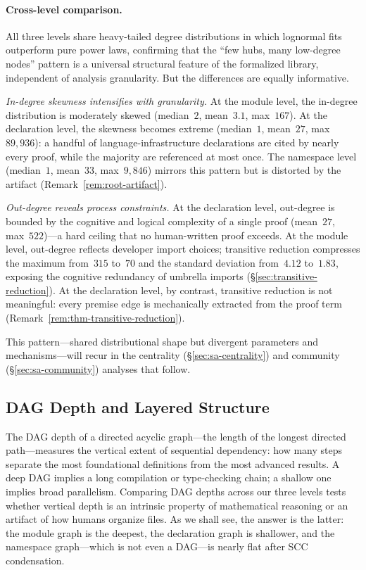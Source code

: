 \paragraph{Cross-level comparison.}
All three levels share heavy-tailed degree distributions in which lognormal fits outperform pure power laws, confirming that the ``few hubs, many low-degree nodes'' pattern is a universal structural feature of the formalized library, independent of analysis granularity. But the differences are equally informative.

\emph{In-degree skewness intensifies with granularity.} At the module level, the in-degree distribution is moderately skewed (median~$2$, mean~$3.1$, max~$167$). At the declaration level, the skewness becomes extreme (median~$1$, mean~$27$, max~$89{,}936$): a handful of language-infrastructure declarations are cited by nearly every proof, while the majority are referenced at most once. The namespace level (median~$1$, mean~$33$, max~$9{,}846$) mirrors this pattern but is distorted by the  artifact (Remark~\ref{rem:root-artifact}).

\emph{Out-degree reveals process constraints.} At the declaration level, out-degree is bounded by the cognitive and logical complexity of a single proof (mean~$27$, max~$522$)---a hard ceiling that no human-written proof exceeds. At the module level, out-degree reflects developer import choices; transitive reduction compresses the maximum from~$315$ to~$70$ and the standard deviation from~$4.12$ to~$1.83$, exposing the cognitive redundancy of umbrella imports (\S\ref{sec:transitive-reduction}). At the declaration level, by contrast, transitive reduction is not meaningful: every premise edge is mechanically extracted from the proof term (Remark~\ref{rem:thm-transitive-reduction}).

This pattern---shared distributional shape but divergent parameters and mechanisms---will recur in the centrality (\S\ref{sec:sa-centrality}) and community (\S\ref{sec:sa-community}) analyses that follow.

\subsection{DAG Depth and Layered Structure}
\label{sec:dag-depth}

The DAG depth of a directed acyclic graph---the length of the longest directed path---measures the vertical extent of sequential dependency: how many steps separate the most foundational definitions from the most advanced results. A deep DAG implies a long compilation or type-checking chain; a shallow one implies broad parallelism. Comparing DAG depths across our three levels tests whether vertical depth is an intrinsic property of mathematical reasoning or an artifact of how humans organize files. As we shall see, the answer is the latter: the module graph is the deepest, the declaration graph is shallower, and the namespace graph---which is not even a DAG---is nearly flat after SCC condensation.

